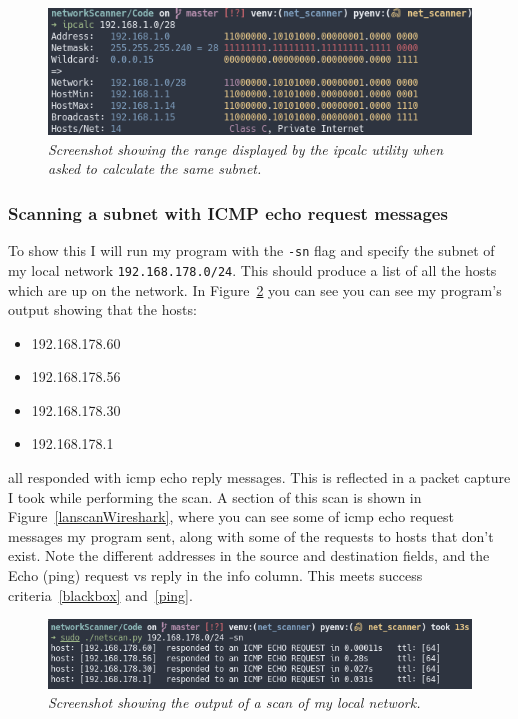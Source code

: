 \documentclass[titlepage]{article}
\let\Oldsubsubsection\subsubsection{}
\renewcommand{\subsubsection}{\FloatBarrier\Oldsubsubsection}
\begin{document}
\begin{figure}[H]
  \centering
  \includegraphics[width=\textwidth]{ipcalclist.png}
  \caption{\textit{%
    Screenshot showing the range displayed by the ipcalc utility when asked to calculate
    the same subnet.
}}\label{cidrwebproof}
\end{figure}

\subsubsection{Scanning a subnet with ICMP echo request messages}\label{test:pingscan}
To show this I will run my program with the \verb|-sn| flag and specify the
subnet of my local network \verb|192.168.178.0/24|.
This should produce a list of all the hosts which are up on the network.
In Figure~\ref{lanscantest} you can see you can see my program's output
showing that the hosts:
\begin{itemize}
  \item{192.168.178.60}
  \item{192.168.178.56}
  \item{192.168.178.30}
  \item{192.168.178.1}
\end{itemize}
all responded with \gls{icmp} echo reply messages.
This is reflected in a packet capture I took while performing the scan.
A section of this scan is shown in Figure~\ref{lanscanWireshark},
where you can see some of \gls{icmp} echo request messages my program sent,
along with some of the requests to hosts that don't exist.
Note the different addresses in the source and destination fields,
and the Echo (ping) request vs reply in the info column.
This meets success criteria~\ref{blackbox} and~\ref{ping}.

\begin{figure}[H]
  \centering
  \includegraphics[width=\textwidth]{pingscantest.png}
  \caption{\textit{%
    Screenshot showing the output of a scan of my local network.
}}\label{lanscantest}
\end{figure}
\end{document}
